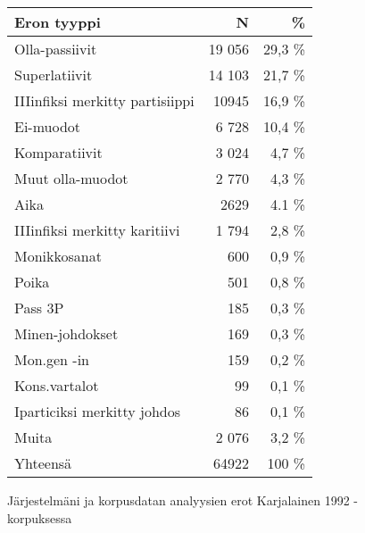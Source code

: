 \documentclass[free]{flammie}
\begin{document}
\begin{figure}
    \caption{Järjestelmäni ja korpusdatan analyysien erot Karjalainen 1992
    -korpuksessa}
    \begin{tabular}{l|r|r}
        \hline
        \bf Eron tyyppi & \bf N & \bf \% \\
        \hline
        Olla-passiivit & 19 056 & 29,3 \% \\
        \hline
        Superlatiivit & 14 103 & 21,7 \% \\
        \hline
        IIIinfiksi merkitty partisiippi & 10945 & 16,9 \% \\
        \hline
        Ei-muodot & 6 728 & 10,4 \% \\
        \hline
        Komparatiivit & 3 024 & 4,7 \% \\
        \hline
        Muut olla-muodot & 2 770 & 4,3 \% \\
        \hline
        Aika & 2629 & 4.1 \% \\
        \hline
        IIIinfiksi merkitty karitiivi & 1 794 & 2,8 \% \\
        \hline
        Monikkosanat & 600 & 0,9 \% \\
        \hline
        Poika & 501 & 0,8 \% \\
        \hline
        Pass 3P & 185 & 0,3 \% \\
        \hline
        Minen-johdokset & 169 & 0,3 \% \\
        \hline
        Mon.gen -in & 159 & 0,2 \% \\
        \hline
        Kons.vartalot & 99 & 0,1 \% \\
        \hline
        Iparticiksi merkitty johdos & 86 & 0,1 \% \\
        \hline
        \hline
        Muita & 2 076 & 3,2 \% \\
        \hline
        Yhteensä & 64922 & 100 \% \\
        \hline
    \end{tabular}
\end{figure}
\end{document}
